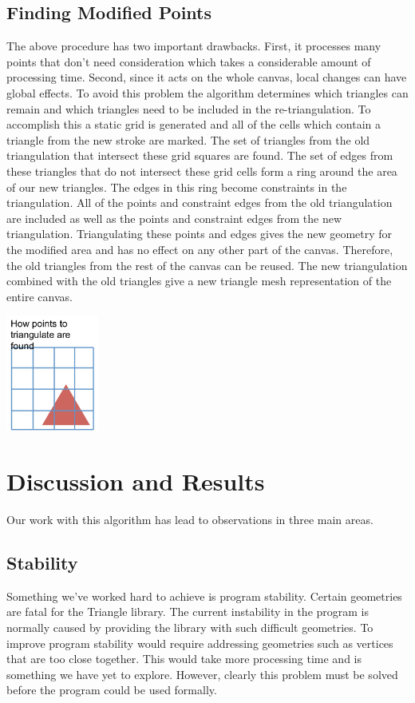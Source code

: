 \documentclass[conference]{acmsiggraph}
\begin{document}
\subsection{Finding Modified Points}
The above procedure has two important drawbacks. First, it processes many points that don't need
consideration which takes a considerable amount of processing time. Second, since it acts on the whole
canvas, local changes can have global effects. To avoid this problem the algorithm determines
which triangles can remain
and which triangles need to be included in the re-triangulation. To accomplish this a static grid
is generated and all of the cells which contain a triangle from the new stroke are marked. 
The set of triangles from the old triangulation that intersect these grid squares are found.
The set of edges from these triangles that do not intersect these grid cells form a ring
around the area of our new triangles. The edges in this ring become constraints
in the triangulation. All of the points and constraint edges from the old triangulation are
included as well as the points and constraint edges from the new triangulation. Triangulating
these points and edges gives the new geometry for the modified area and has no effect on any
other part of the canvas. Therefore, the old triangles from the rest of the canvas can be reused. 
The new triangulation combined with the old triangles give a new triangle mesh representation of the entire canvas.

\includegraphics[height=1.5in]{images/findingmodifiedpoints}

\section{Discussion and Results}
Our work with this algorithm has lead to observations in three main areas.

\subsection{Stability}
Something we've worked hard to achieve is program stability. Certain geometries are fatal
for the Triangle library. The current instability in the program is normally caused by
providing the library with such difficult geometries. To improve program stability would
require addressing geometries such as vertices that are too close together. This would
take more processing time and is something we have yet to explore. However, clearly this
problem must be solved before the program could be used formally.
\end{document}
